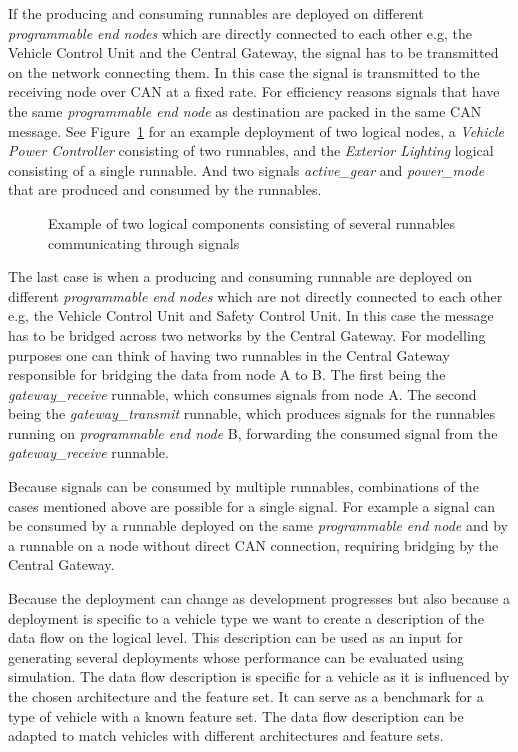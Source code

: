 If the producing and consuming runnables are deployed on different \textit{programmable end nodes} which are directly connected to each other e.g, the Vehicle Control Unit and the Central Gateway, the signal has to be transmitted on the network connecting them. In this case the signal is transmitted to the receiving node over CAN at a fixed rate. For efficiency reasons signals that have the same \textit{programmable end node} as destination are packed in the same CAN message. See Figure~\ref{fig:deployment} for an example deployment of two logical nodes, a \textit{Vehicle Power Controller} consisting of two runnables, and the \textit{Exterior Lighting} logical consisting of a single runnable. And two signals \textit{active\_gear} and \textit{power\_mode} that are produced and consumed by the runnables.

\begin{figure}[htbp]
    \centering
 \caption{Example of two logical components consisting of several runnables communicating through signals}
\label{fig:deployment}
\end{figure}

The last case is when a producing and consuming runnable are deployed on different \textit{programmable end nodes} which are not directly connected to each other e.g, the Vehicle Control Unit and Safety Control Unit. In this case the message has to be bridged across two networks by the Central Gateway. For modelling purposes one can think of having two runnables in the Central Gateway responsible for bridging the data from node A to B. The first being the \textit{gateway\_receive} runnable, which consumes signals from node A. The second being the \textit{gateway\_transmit} runnable, which produces signals for the runnables running on \textit{programmable end node} B, forwarding the consumed signal from the \textit{gateway\_receive} runnable.

Because signals can be consumed by multiple runnables, combinations of the cases mentioned above are possible for a single signal. For example a signal can be consumed by a runnable deployed on the same \textit{programmable end node} and by a runnable on a node without direct CAN connection, requiring bridging by the Central Gateway.

Because the deployment can change as development progresses but also because a deployment is specific to a vehicle type we want to create a description of the data flow on the logical level. This description can be used as an input for generating several deployments whose performance can be evaluated using simulation. The data flow description is specific for a vehicle as it is influenced by the chosen architecture and the feature set. It can serve as a benchmark for a type of vehicle with a known feature set. The data flow description can be adapted to match vehicles with different architectures and feature sets. 

